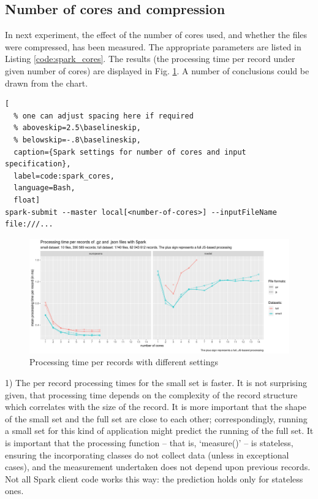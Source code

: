 \subsection{Number of cores and compression}

In next experiment, the effect of the number of cores used, and whether the files were compressed, has been measured. The appropriate parameters are listed in Listing \ref{code:spark_cores}. The results (the processing time per record under given number of cores) are displayed in Fig. \ref{figure:small-and-full-measurements-two-servers}. A number of conclusions could be drawn from the chart.

\begin{lstlisting}[
  % one can adjust spacing here if required
  % aboveskip=2.5\baselineskip,
  % belowskip=-.8\baselineskip,
  caption={Spark settings for number of cores and input specification},
  label=code:spark_cores,
  language=Bash,
  float]
spark-submit --master local[<number-of-cores>] --inputFileName file:///...
\end{lstlisting}

\begin{figure}
\includegraphics[width=\textwidth]{images/chapter06/small-and-full-measurements-two-servers.png}
\caption{Processing time per records with different settings}
\label{figure:small-and-full-measurements-two-servers}
\end{figure}

1) The per record processing times for the small set is faster. It is not surprising given, that processing time depends on the complexity of the record structure which correlates with the size of the record. It is more important that the shape of the small set and the full set are close to each other; correspondingly, running a small set for this kind of application might predict the running of the full set. It is important that the processing function -- that is, `measure()' -- is stateless, ensuring the incorporating classes do not collect data (unless in exceptional cases), and the measurement undertaken does not depend upon previous records. Not all Spark client code works this way: the prediction holds only for stateless ones.

